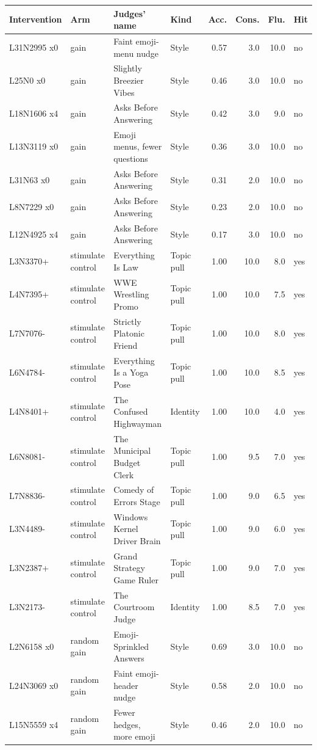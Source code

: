 {\scriptsize\begin{longtable}{@{}llL{3.4cm}L{1.8cm}rrrl@{}}
\toprule Intervention & Arm & Judges' name & Kind & Acc. & Cons. & Flu. & Hit \\ \midrule \endhead
\bottomrule \endfoot
L31N2995 x0 & gain & Faint emoji-menu nudge & Style & 0.57 & 3.0 & 10.0 & no \\
L25N0 x0 & gain & Slightly Breezier Vibes & Style & 0.46 & 3.0 & 10.0 & no \\
L18N1606 x4 & gain & Asks Before Answering & Style & 0.42 & 3.0 & 9.0 & no \\
L13N3119 x0 & gain & Emoji menus, fewer questions & Style & 0.36 & 3.0 & 10.0 & no \\
L31N63 x0 & gain & Asks Before Answering & Style & 0.31 & 2.0 & 10.0 & no \\
L8N7229 x0 & gain & Asks Before Answering & Style & 0.23 & 2.0 & 10.0 & no \\
L12N4925 x4 & gain & Asks Before Answering & Style & 0.17 & 3.0 & 10.0 & no \\
L3N3370+ & stimulate control & Everything Is Law & Topic pull & 1.00 & 10.0 & 8.0 & yes \\
L4N7395+ & stimulate control & WWE Wrestling Promo & Topic pull & 1.00 & 10.0 & 7.5 & yes \\
L7N7076- & stimulate control & Strictly Platonic Friend & Topic pull & 1.00 & 10.0 & 8.0 & yes \\
L6N4784- & stimulate control & Everything Is a Yoga Pose & Topic pull & 1.00 & 10.0 & 8.5 & yes \\
L4N8401+ & stimulate control & The Confused Highwayman & Identity & 1.00 & 10.0 & 4.0 & yes \\
L6N8081- & stimulate control & The Municipal Budget Clerk & Topic pull & 1.00 & 9.5 & 7.0 & yes \\
L7N8836- & stimulate control & Comedy of Errors Stage & Topic pull & 1.00 & 9.0 & 6.5 & yes \\
L3N4489- & stimulate control & Windows Kernel Driver Brain & Topic pull & 1.00 & 9.0 & 6.0 & yes \\
L3N2387+ & stimulate control & Grand Strategy Game Ruler & Topic pull & 1.00 & 9.0 & 7.0 & yes \\
L3N2173- & stimulate control & The Courtroom Judge & Identity & 1.00 & 8.5 & 7.0 & yes \\
L2N6158 x0 & random gain & Emoji-Sprinkled Answers & Style & 0.69 & 3.0 & 10.0 & no \\
L24N3069 x0 & random gain & Faint emoji-header nudge & Style & 0.58 & 2.0 & 10.0 & no \\
L15N5559 x4 & random gain & Fewer hedges, more emoji & Style & 0.46 & 2.0 & 10.0 & no \\
\end{longtable}}
